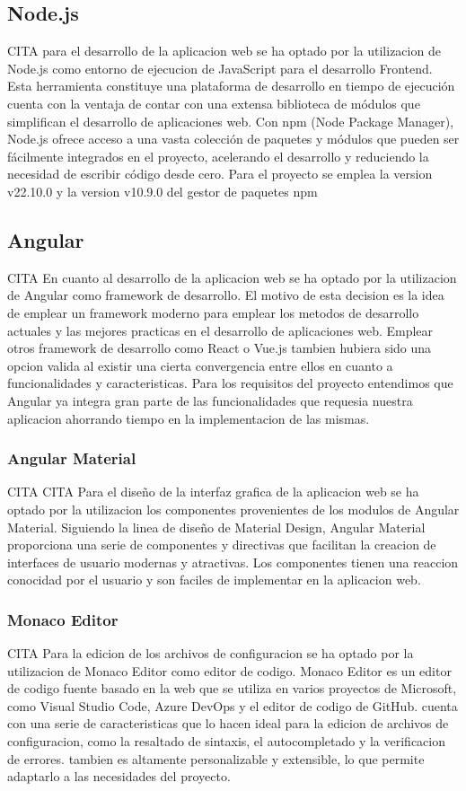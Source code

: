 \documentclass[12pt, a4paper, twoside]{article}
\begin{document}
\subsection{Node.js}
CITA
para el desarrollo de la aplicacion web se ha optado por la utilizacion de Node.js como entorno de ejecucion de JavaScript para el desarrollo Frontend.
Esta herramienta constituye una plataforma de desarrollo en tiempo de ejecución cuenta con la ventaja de contar con una extensa biblioteca de módulos que simplifican el desarrollo de aplicaciones web.
Con npm (Node Package Manager), Node.js ofrece acceso a una vasta colección de paquetes y módulos que pueden ser fácilmente integrados en el proyecto, acelerando el desarrollo y reduciendo la necesidad de escribir código desde cero.
Para el proyecto se emplea la version v22.10.0 y la version v10.9.0 del gestor de paquetes npm
\subsection{Angular}
CITA
En cuanto al desarrollo de la aplicacion web se ha optado por la utilizacion de Angular como framework de desarrollo.
El motivo de esta decision es la idea de emplear un framework moderno para emplear los metodos de desarrollo actuales y las mejores practicas en el desarrollo de aplicaciones web.
Emplear otros framework de desarrollo como React o Vue.js tambien hubiera sido una opcion valida al existir una cierta convergencia entre ellos en cuanto a funcionalidades y caracteristicas.
Para los requisitos del proyecto entendimos que Angular ya integra gran parte de las funcionalidades que requesia nuestra aplicacion ahorrando tiempo en la implementacion de las mismas.
\subsubsection{Angular Material}
CITA
CITA Para el diseño de la interfaz grafica de la aplicacion web se ha optado por la utilizacion los componentes provenientes de los modulos de Angular Material.
Siguiendo la linea de diseño de Material Design, Angular Material proporciona una serie de componentes y directivas que facilitan la creacion de interfaces de usuario modernas y atractivas.
Los componentes tienen una reaccion conocidad por el usuario y son faciles de implementar en la aplicacion web.
\subsubsection{Monaco Editor}
CITA Para la edicion de los archivos de configuracion se ha optado por la utilizacion de Monaco Editor como editor de codigo.
Monaco Editor es un editor de codigo fuente basado en la web que se utiliza en varios proyectos de Microsoft, como Visual Studio Code, Azure DevOps y el editor de codigo de GitHub.
cuenta con una serie de caracteristicas que lo hacen ideal para la edicion de archivos de configuracion, como la resaltado de sintaxis, el autocompletado y la verificacion de errores.
tambien es altamente personalizable y extensible, lo que permite adaptarlo a las necesidades del proyecto.
\end{document}
